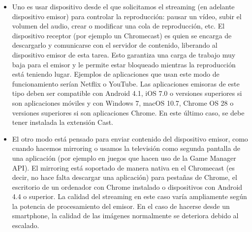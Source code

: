 \begin{itemize}

	\item Uno es usar dispositivo desde el que solicitamos el streaming (en adelante dispositivo emisor) para controlar la reproducción: pausar un vídeo, subir el volumen del audio, crear o modificar una cola de reproducción, etc.
	El dispositivo receptor (por ejemplo un Chromecast) es quien se encarga de descargarlo y comunicarse con el servidor de contenido, liberando al dispositivo emisor de esta tarea.
	Esto garantiza una carga de trabajo muy baja para el emisor y le permite estar bloqueado mientras la reproducción está teniendo lugar.
	Ejemplos de aplicaciones que usan este modo de funcionamiento serían Netflix o YouTube.
	Las aplicaciones emisoras de este tipo deben ser compatible con Android 4.1, iOS 7.0 o versiones superiores si son aplicaciones móviles y con Windows 7, macOS 10.7, Chrome OS 28 o versiones superiores si son aplicaciones Chrome.
	En este último caso, se debe tener instalada la extensión Cast.

	\item El otro modo está pensado para enviar contenido del dispositivo emisor, como cuando hacemos mirroring o usamos la televisión como segunda pantalla de una aplicación (por ejemplo en juegos que hacen uso de la Game Manager API).
	El mirroring está soportado de manera nativa en el Chromecast (es decir, no hace falta descargar una aplicación) para pestañas de Chrome, el escritorio de un ordenador con Chrome instalado o dispositivos con Android 4.4 o superior.
	La calidad del streaming en este caso varía ampliamente según la potencia de procesamiento del emisor.
	En el caso de hacerse desde un smartphone, la calidad de las imágenes normalmente se deteriora debido al escalado.

\end{itemize}

